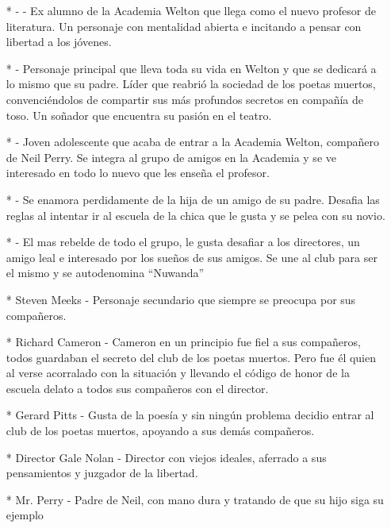 \documentclass[a5 paper,11 pt]{article}
\begin{document}
{\begin{itemize}
     \item[*]  - - Ex alumno de la Academia Welton que llega como el nuevo profesor de literatura. Un personaje con mentalidad abierta e incitando a pensar con libertad a los jóvenes. 
    \item[*]  - Personaje principal que lleva toda su vida en Welton y que se dedicará a lo mismo que su padre. Líder que reabrió la sociedad de los poetas muertos, convenciéndolos de compartir sus más profundos secretos en compañía de toso. Un soñador que encuentra su pasión en el teatro. 	
    \item[*]  - Joven adolescente que acaba de entrar a la Academia Welton, compañero de Neil Perry. Se integra al grupo de amigos en la Academia y se ve interesado en todo lo nuevo que les enseña el profesor.
    \item[*] - Se enamora perdidamente de la hija de un amigo de su padre. Desafia las reglas al intentar ir al escuela de la chica que le gusta y se pelea con su novio. 	
    \item[*]  - El mas rebelde de todo el grupo, le gusta desafiar a los directores, un amigo leal e interesado por los sueños de sus amigos. Se une al club para ser el mismo y se autodenomina “Nuwanda”
    \item[*]Steven Meeks - Personaje secundario que siempre se preocupa por sus compañeros.
    \item[*]Richard Cameron - Cameron en un principio fue fiel  a sus compañeros, todos guardaban el secreto del club de los poetas muertos. Pero fue él quien al verse acorralado con la situación y llevando el código de honor de la escuela  delato a todos sus compañeros con el director.
    \item[*]Gerard Pitts - Gusta de la poesía y sin ningún problema decidio entrar al club de los poetas muertos, apoyando a sus demás compañeros.	
    \item[*]Director Gale Nolan - Director con viejos ideales, aferrado a sus pensamientos y juzgador de la libertad.	
    \item[*]Mr. Perry 	- Padre de Neil, con mano dura y tratando de que su hijo siga su ejemplo
    
    
\end{itemize}

}
\end{document}
